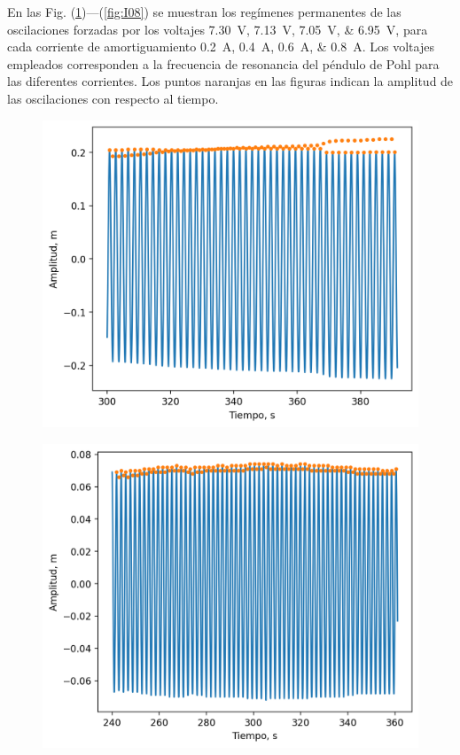 En las Fig. (\ref{fig:I02})---(\ref{fig:I08}) se muestran los regímenes permanentes de 
las oscilaciones forzadas por los voltajes \qtylist{7,30;7,13;7,05;6,95}{\volt}, para cada corriente de amortiguamiento \qtylist{0,2;0,4;0,6;0,8}{\ampere}. Los voltajes empleados
corresponden a la frecuencia de resonancia del péndulo de Pohl para las diferentes
corrientes. Los puntos naranjas en las figuras indican la amplitud de las oscilaciones con
respecto al tiempo.
\begin{figure}[H]
	\centering
	\includegraphics[width=\linewidth]{results/res/I02V73.png}
	\label{fig:I02}
\end{figure}

\begin{figure}[H]
	\centering
	\includegraphics[width=\linewidth]{results/res/I04V713.png}
	\label{fig:I04}
\end{figure}

